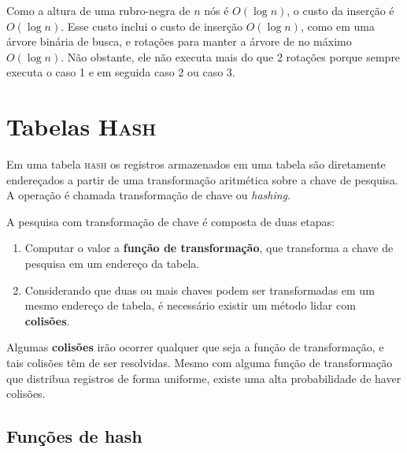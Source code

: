 Como a altura de uma rubro-negra de $n$ nós é $O(\log n)$, o custo da inserção
é $O(\log n)$.
Esse custo inclui o custo de inserção $O(\log n)$, como em uma árvore binária
de busca, e rotações para manter a árvore de no máximo $O(\log n)$.
Não obstante, ele não executa mais do que 2 rotações porque sempre executa 
o caso 1 e em seguida caso 2 ou caso 3.

%

\section{Tabelas \textsc{Hash}}

Em uma tabela \textsc{hash} os registros armazenados em uma tabela são
diretamente endereçados a partir de uma transformação aritmética sobre a chave
de pesquisa.
A operação é chamada transformação de chave ou \emph{hashing}.

A pesquisa com transformação de chave é composta de duas etapas:
\begin{enumerate}
\item Computar o valor a {\bf função de transformação}, que 
transforma a chave de pesquisa em um endereço da tabela.

\item Considerando que duas ou mais chaves podem ser transformadas em um
mesmo endereço de tabela, é necessário existir um método lidar
com \textbf{colisões}.
\end{enumerate}

Algumas {\bf colisões} irão ocorrer qualquer que seja a função de transformação,
e tais colisões têm de ser resolvidas.
Mesmo com alguma função de transformação que distribua registros de forma uniforme,
existe uma alta probabilidade de haver colisões.

\subsection{Funções de hash}

